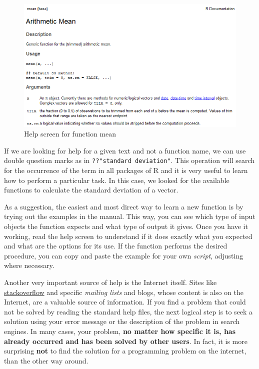 \documentclass[
  12pt,
]{book}
\begin{document}
\begin{figure}[!htbp]

{\centering \includegraphics[width=1\linewidth]{figs/ExemploAjuda} 

}

\caption{Help screen for function mean}\label{fig:example-help}
\end{figure}

If we are looking for help for a given text and not a function name, we can use double question marks as in \texttt{??"standard\ deviation"}. This operation will search for the occurrence of the term in all packages of R and it is very useful to learn how to perform a particular task. In this case, we looked for the available functions to calculate the standard deviation of a vector.

As a suggestion, the easiest and most direct way to learn a new function is by trying out the examples in the manual. This way, you can see which type of input objects the function expects and what type of output it gives. Once you have it working, read the help screen to understand if it does exactly what you expected and what are the options for its use. If the function performs the desired procedure, you can copy and paste the example for your own \emph{script}, adjusting where necessary.

Another very important source of help is the Internet itself. Sites like \href{http://stackoverflow.com/}{stackoverflow} and specific \emph{mailing lists} and blogs, whose content is also on the Internet, are a valuable source of information. If you find a problem that could not be solved by reading the standard help files, the next logical step is to seek a solution using your error message or the description of the problem in search engines. In many cases, your problem, \textbf{no matter how specific it is, has already occurred and has been solved by other users}. In fact, it is more surprising \textbf{not} to find the solution for a programming problem on the internet, than the other way around.
\end{document}
